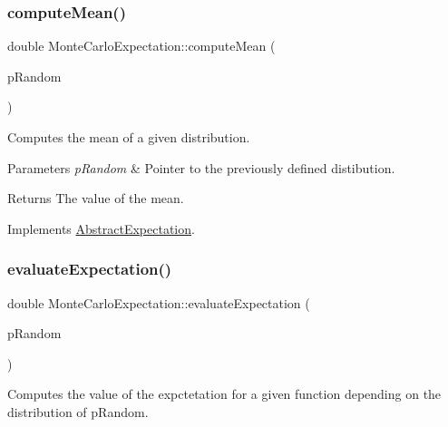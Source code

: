 \subsubsection{\texorpdfstring{compute\+Mean()}{computeMean()}}
{\footnotesize\ttfamily double Monte\+Carlo\+Expectation\+::compute\+Mean (\begin{DoxyParamCaption}\item[{const \hyperlink{classAbstractVariable}{Abstract\+Variable} $\ast$}]{p\+Random }\end{DoxyParamCaption})\hspace{0.3cm}{\ttfamily [virtual]}}



Computes the mean of a given distribution. 


\begin{DoxyParams}{Parameters}
{\em p\+Random} & Pointer to the previously defined distibution. \\
\hline
\end{DoxyParams}
\begin{DoxyReturn}{Returns}
The value of the mean. 
\end{DoxyReturn}


Implements \hyperlink{classAbstractExpectation_ac0fd8ea2ea546f6d01adec641886db14}{Abstract\+Expectation}.

\mbox{\label{classMonteCarloExpectation_a3ded4ade26374189ab6d79f2c6928b0a}} 
\subsubsection{\texorpdfstring{evaluate\+Expectation()}{evaluateExpectation()}}
{\footnotesize\ttfamily double Monte\+Carlo\+Expectation\+::evaluate\+Expectation (\begin{DoxyParamCaption}\item[{const \hyperlink{classAbstractVariable}{Abstract\+Variable} $\ast$}]{p\+Random }\end{DoxyParamCaption})\hspace{0.3cm}{\ttfamily [virtual]}}



Computes the value of the expctetation for a given function depending on the distribution of p\+Random. 


